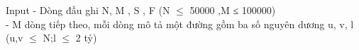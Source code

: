 Input
- Dòng đầu ghi N, M , S , F (N $\le$  50000 ,M ≤ 100000)   
\\   - M dòng tiếp theo, mỗi dòng mô tả một đường gồm ba số nguyên dương u, v, l (u,v $\le$ N;l $\le$ 2 tỷ)